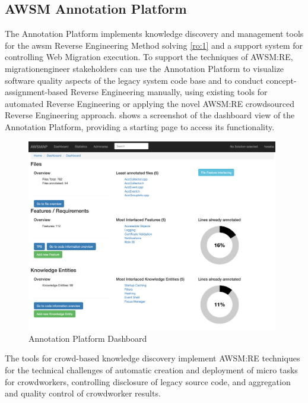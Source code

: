 \vspace{-10pt}
\hypertarget{sec:tools.annotationplatform}{%
\subsection{AWSM Annotation Platform}\label{sec:tools.annotationplatform}}
\vspace{10pt}

The Annotation Platform implements knowledge discovery and management tools for the \gls{awsm} Reverse Engineering Method solving \cref{ro:1} and a support system for controlling \gls{Web Migration} execution.
To support the techniques of AWSM:RE, \gls{migrationengineer} stakeholders can use the Annotation Platform to visualize  software quality aspects of the legacy system code base and to conduct concept-assignment-based \gls{Reverse Engineering} manually, using existing tools for automated \gls{Reverse Engineering} or applying the novel AWSM:RE crowdsourced \gls{Reverse Engineering} approach.
 shows a screenshot of the dashboard view of the Annotation Platform, providing a starting page to access its functionality.
\begin{figure}[h!]
\hypertarget{fig:ap-dashboard}{%
\centering
\includegraphics[width=0.98\textwidth]{../figures/screenshots/ap-dashboard-2.png}
\caption{Annotation Platform Dashboard}\label{fig:ap-dashboard}
}
\end{figure}
The tools for crowd-based knowledge discovery implement AWSM:RE techniques for the technical challenges of automatic creation and deployment of micro tasks for crowdworkers, controlling disclosure of legacy source code, and aggregation and quality control of crowdworker results.
